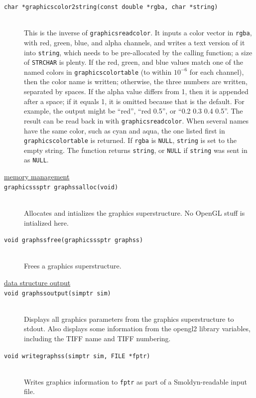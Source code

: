 \documentclass {scrbook}
\newcommand {\ttt} {\texttt}
\begin{document}
\begin{description}
\item[\ttt{char *graphicscolor2string(const double *rgba, char *string)}]
\hfill \\
This is the inverse of \ttt{graphicsreadcolor}. It inputs a color vector in \ttt{rgba}, with red, green, blue, and alpha channels, and writes a text version of it into \ttt{string}, which needs to be pre-allocated by the calling function; a size of \ttt{STRCHAR} is plenty. If the red, green, and blue values match one of the named colors in \ttt{graphicscolortable} (to within $10^{-6}$ for each channel), then the color name is written; otherwise, the three numbers are written, separated by spaces. If the alpha value differs from 1, then it is appended after a space; if it equals 1, it is omitted because that is the default. For example, the output might be ``red'', ``red 0.5'', or ``0.2 0.3 0.4 0.5''. The result can be read back in with \ttt{graphicsreadcolor}. When several names have the same color, such as cyan and aqua, the one listed first in \ttt{graphicscolortable} is returned. If \ttt{rgba} is \ttt{NULL}, \ttt{string} is set to the empty string. The function returns \ttt{string}, or \ttt{NULL} if \ttt{string} was sent in as \ttt{NULL}.

\item[\underline{memory management}]

\item[\ttt{graphicsssptr graphssalloc(void)}]
\hfill \\
Allocates and intializes the graphics superstructure. No OpenGL stuff is intialized here.

\item[\ttt{void graphssfree(graphicsssptr graphss)}]
\hfill \\
Frees a graphics superstructure.

\item[\underline{data structure output}]

\item[\ttt{void graphssoutput(simptr sim)}]
\hfill \\
Displays all graphics parameters from the graphics superstructure to stdout. Also displays some information from the opengl2 library variables, including the TIFF name and TIFF numbering.

\item[\ttt{void writegraphss(simptr sim, FILE *fptr)}]
\hfill \\
Writes graphics information to \ttt{fptr} as part of a Smoldyn-readable input file.


\end{description}
\end{document}
